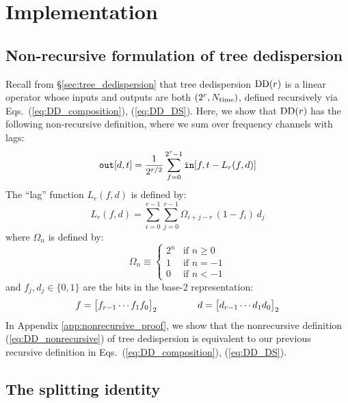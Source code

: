 \documentclass{article}
\numberwithin{equation}{section}   %
\def\DD{{\rm DD}}
\begin{document}
\clearpage

\section{Implementation}

\subsection{Non-recursive formulation of tree dedispersion}

Recall from \S\ref{sec:tree_dedispersion} that tree dedispersion $\DD(r)$ is a linear operator
whose inputs and outputs are both $(2^r,N_{\rm time})$, defined recursively via
Eqs.\ (\ref{eq:DD_composition}), (\ref{eq:DD_DS}).
Here, we show that $\DD(r)$ has the following non-recursive definition, where
we sum over frequency channels with lags:
\begin{equation}
{\tt out}[d,t] = \frac{1}{2^{r/2}} \sum_{f=0}^{2^r-1} {\tt in}[f,t - L_r(f,d)]  \label{eq:DD_nonrecursive}
\end{equation}
The ``lag'' function $L_r(f,d)$ is defined by:
\begin{equation}
L_r(f,d) = \sum_{i=0}^{r-1} \sum_{j=0}^{r-1} \Omega_{i+j-r} \, (1-f_i) \, d_j  \label{eq:L_def}
\end{equation}
where $\Omega_n$ is defined by:
\begin{equation}
\Omega_n \equiv \begin{cases}
 2^n & \mbox{if } n \ge 0 \\
  1 & \mbox{if } n = -1 \\
  0 & \mbox{if } n < -1
\end{cases}
\end{equation}
and $f_j,d_j \in \{0,1\}$ are the bits in the base-2 representation:
\begin{equation}
f = \big[ f_{r-1} \cdots f_1 f_0 \big]_2
  \hspace{1.5cm}
d = \big[ d_{r-1} \cdots d_1 d_0 \big]_2
\end{equation}
In Appendix \ref{app:nonrecursive_proof}, we show that the nonrecursive definition 
(\ref{eq:DD_nonrecursive}) of tree dedispersion is equivalent to our previous
recursive definition in Eqs.\ (\ref{eq:DD_composition}), (\ref{eq:DD_DS}).

\subsection{The splitting identity}
\label{ssec:splitting_identity}
\end{document}

